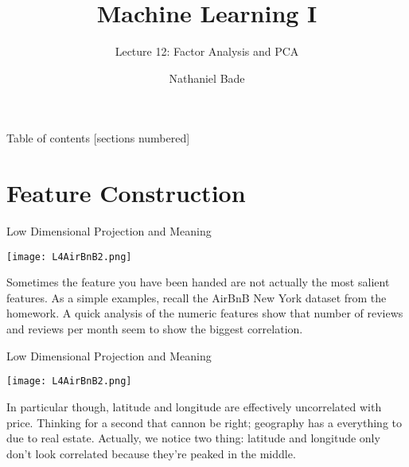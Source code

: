 \documentclass[10pt, table, dvipsnames,xcdraw,handout]{beamer}
\title{Machine Learning I}
\subtitle{Lecture 12: Factor Analysis and PCA}
\date{}
\author{Nathaniel Bade}
\institute{Northeastern University Department of Mathematics}
\begin{document}
\maketitle

\begin{frame}{Table of contents}
  [sections numbered]
  \tableofcontents[hideallsubsections]
\end{frame}





\section{Feature Construction}


\begin{frame}[fragile]{Low Dimensional Projection and Meaning}
  \begin{minipage}[t][0.5\textheight][t]{\textwidth}
	\centering \texttt{[image: L4AirBnB2.png]}
  \end{minipage}
  \vfill
\begin{minipage}[t][0.5\textheight][t]{\textwidth}
Sometimes the feature you have been handed are not actually the most salient features. As a simple examples, recall the AirBnB New York dataset from the homework. A quick analysis of the numeric features show that number of reviews and reviews per month seem to show the biggest correlation.
\end{minipage}
\end{frame}




\begin{frame}[fragile]{Low Dimensional Projection and Meaning}
  \begin{minipage}[t][0.5\textheight][t]{\textwidth}
	\centering \texttt{[image: L4AirBnB2.png]}
  \end{minipage}
  \vfill
\begin{minipage}[t][0.5\textheight][t]{\textwidth}
In particular though, latitude and longitude are effectively uncorrelated with price. \pause Thinking for a second that cannon be right; geography has a everything to due to real estate. Actually, we notice two thing: latitude and longitude only don't look correlated because they're peaked in the middle. 
\end{minipage}
\end{frame}
\end{document}

